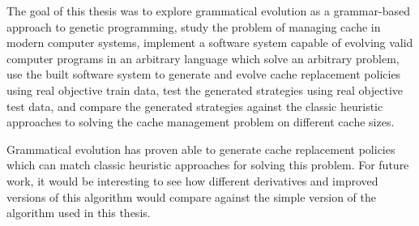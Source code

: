 The goal of this thesis was to explore grammatical evolution as a grammar-based approach to genetic programming, study the problem of managing cache in modern computer systems, implement a software system capable of evolving valid computer programs in an arbitrary language which solve an arbitrary problem, use the built software system to generate and evolve cache replacement policies using real objective train data, test the generated strategies using real objective test data, and compare the generated strategies against the classic heuristic approaches to solving the cache management problem on different cache sizes.

Grammatical evolution has proven able to generate cache replacement policies which can match classic heuristic approaches for solving this problem. For future work, it would be interesting to see how different derivatives and improved versions of this algorithm would compare against the simple version of the algorithm used in this thesis.